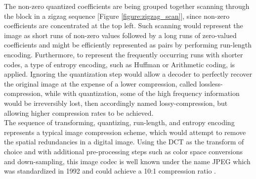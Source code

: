\documentclass[a4paper,11pt,oneside]{article}
\begin{document}
The non-zero quantized coefficients are being grouped together scanning through the block in a zigzag sequence [Figure \ref{figure:zigzag_scan}], since non-zero coefficients are concentrated at the top left. Such scanning would represent the image as short runs of non-zero values followed by a long runs of zero-valued coefficients and might be efficiently represented as pairs by performing run-length encoding. Furthermore, to represent the frequently occurring runs with shorter codes, a type of entropy encoding, such as Huffman or Arithmetic coding, is applied. Ignoring the quantization step would allow a decoder to perfectly recover the original image at the expense of a lower compression, called lossless-compression, while with quantization, some of the high frequency information would be irreversibly lost, then accordingly named lossy-compression, but allowing higher compression rates to be achieved. \\ 
\indent The sequence of transforming, quantizing, run-length, and entropy encoding represents a typical image compression scheme, which would attempt to remove the spatial redundancies in a digital image. Using the DCT as the transform of choice and with additional pre-processing steps such as color space conversions and down-sampling, this image codec is well known under the name JPEG which was standardized in 1992 and could achieve a 10:1 compression ratio \cite{jpeg_nasa}. \\
\end{document}
